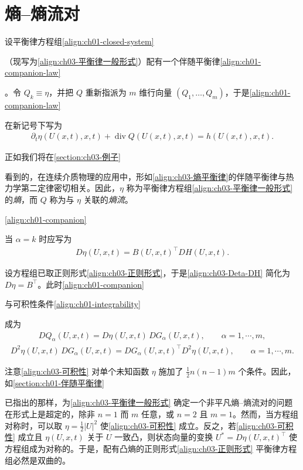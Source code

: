 \documentclass[../../main.tex]{subfiles}
\begin{document}
\section{熵--熵流对}\label{section:ch03-熵流对}

设平衡律方程组\eqref{align:ch01-closed-system}%

（现写为\eqref{align:ch03-平衡律一般形式}）配有一个伴随平衡律\eqref{align:ch01-companion-law}%

。令 $Q_{k}\equiv\eta$，并把 $Q$ 重新指派为 $m$ 维行向量 $(Q_{1},\ldots,Q_{m})$，于是\eqref{align:ch01-companion-law}%

在新记号下写为
\begin{align}
\partial_{t}\eta(U(x,t),x,t)+\operatorname{div}Q(U(x,t),x,t)=h(U(x,t),x,t).
\label{align:ch03-熵平衡律}
\end{align}

正如我们将在\cref{section:ch03-例子}%

看到的，在连续介质物理的应用中，形如\eqref{align:ch03-熵平衡律}的伴随平衡律与热力学第二定律密切相关。因此，$\eta$ 称为平衡律方程组\eqref{align:ch03-平衡律一般形式}的\emph{熵}，而 $Q$ 称为与 $\eta$ 关联的\emph{熵流}。

\eqref{align:ch01-companion}%

当 $\alpha=k$ 时应写为
\begin{align}
D\eta(U,x,t)=B(U,x,t)^{\top}DH(U,x,t).
\label{align:ch03-Deta-DH}
\end{align}

设方程组已取正则形式\eqref{align:ch03-正则形式}，于是\eqref{align:ch03-Deta-DH} 简化为 $D\eta=B^{\top}$。此时\eqref{align:ch01-companion}%

与可积性条件\eqref{align:ch01-integrability}%

成为
\begin{align}
DQ_{\alpha}(U,x,t)=D\eta(U,x,t)\,DG_{\alpha}(U,x,t),\qquad \alpha=1,\cdots,m,
\label{align:ch03-DQ}
\end{align}
\begin{align}
D^{2}\eta(U,x,t)\,DG_{\alpha}(U,x,t)=DG_{\alpha}(U,x,t)^{\top}D^{2}\eta(U,x,t),\qquad \alpha=1,\cdots,m.
\label{align:ch03-可积性}
\end{align}

注意\eqref{align:ch03-可积性} 对单个未知函数 $\eta$ 施加了 $\frac{1}{2}n(n-1)m$ 个条件。因此，如\cref{section:ch01-伴随平衡律}%

已指出的那样，为\eqref{align:ch03-平衡律一般形式} 确定一个非平凡熵--熵流对的问题在形式上是超定的，除非 $n=1$ 而 $m$ 任意，或 $n=2$ 且 $m=1$。然而，当方程组对称时，可以取 $\eta=\frac{1}{2}|U|^{2}$ 使\eqref{align:ch03-可积性} 成立。反之，若\eqref{align:ch03-可积性} 成立且 $\eta(U,x,t)$ 关于 $U$ 一致凸，则状态向量的变换 $U^{*}=D\eta(U,x,t)^{\top}$ 使方程组成为对称的。于是，配有凸熵的正则形式\eqref{align:ch03-正则形式} 平衡律方程组必然是双曲的。
\end{document}
